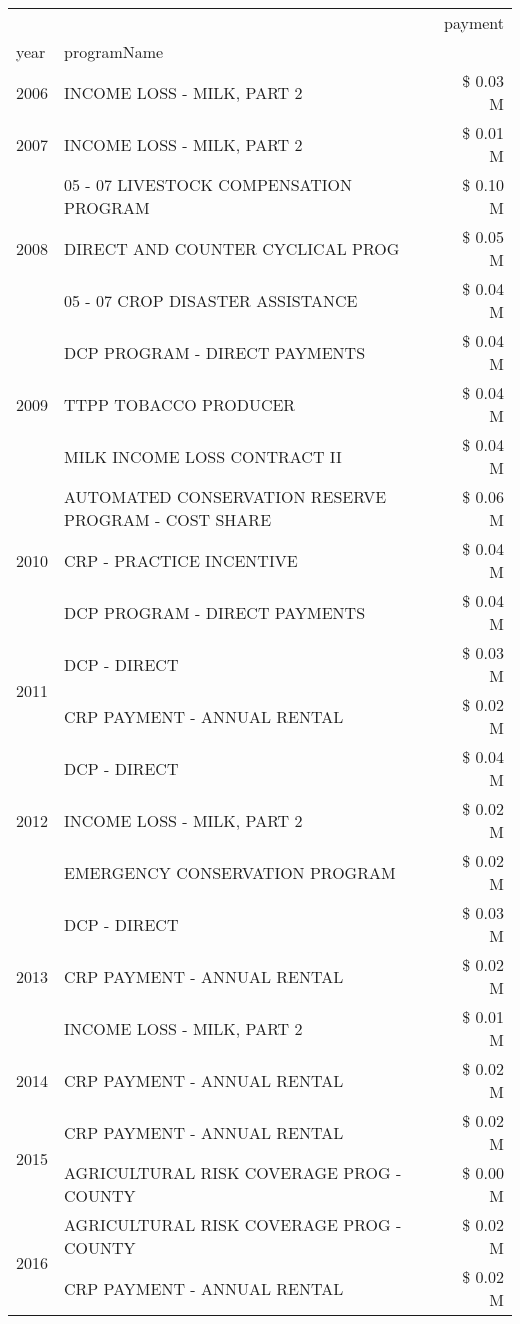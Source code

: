 \begin{tabular}{llr}
\toprule
 &  & payment \\
year & programName &  \\
\midrule
2006 & INCOME LOSS - MILK, PART 2 & \$ 0.03 M \\
\cline{1-3}
2007 & INCOME LOSS - MILK, PART 2 & \$ 0.01 M \\
\cline{1-3}
\multirow[t]{3}{*}{2008} & 05 - 07 LIVESTOCK COMPENSATION PROGRAM & \$ 0.10 M \\
 & DIRECT AND COUNTER CYCLICAL PROG & \$ 0.05 M \\
 & 05 - 07 CROP DISASTER ASSISTANCE & \$ 0.04 M \\
\cline{1-3}
\multirow[t]{3}{*}{2009} & DCP PROGRAM - DIRECT PAYMENTS & \$ 0.04 M \\
 & TTPP TOBACCO PRODUCER & \$ 0.04 M \\
 & MILK INCOME LOSS CONTRACT II & \$ 0.04 M \\
\cline{1-3}
\multirow[t]{3}{*}{2010} & AUTOMATED CONSERVATION RESERVE PROGRAM - COST SHARE & \$ 0.06 M \\
 & CRP - PRACTICE INCENTIVE & \$ 0.04 M \\
 & DCP PROGRAM - DIRECT PAYMENTS & \$ 0.04 M \\
\cline{1-3}
\multirow[t]{2}{*}{2011} & DCP - DIRECT & \$ 0.03 M \\
 & CRP PAYMENT - ANNUAL RENTAL & \$ 0.02 M \\
\cline{1-3}
\multirow[t]{3}{*}{2012} & DCP - DIRECT & \$ 0.04 M \\
 & INCOME LOSS - MILK, PART 2 & \$ 0.02 M \\
 & EMERGENCY CONSERVATION PROGRAM & \$ 0.02 M \\
\cline{1-3}
\multirow[t]{3}{*}{2013} & DCP - DIRECT & \$ 0.03 M \\
 & CRP PAYMENT - ANNUAL RENTAL & \$ 0.02 M \\
 & INCOME LOSS - MILK, PART 2 & \$ 0.01 M \\
\cline{1-3}
2014 & CRP PAYMENT - ANNUAL RENTAL & \$ 0.02 M \\
\cline{1-3}
\multirow[t]{2}{*}{2015} & CRP PAYMENT - ANNUAL RENTAL & \$ 0.02 M \\
 & AGRICULTURAL RISK COVERAGE PROG - COUNTY & \$ 0.00 M \\
\cline{1-3}
\multirow[t]{3}{*}{2016} & AGRICULTURAL RISK COVERAGE PROG - COUNTY & \$ 0.02 M \\
 & CRP PAYMENT - ANNUAL RENTAL & \$ 0.02 M \\

\end{tabular}
